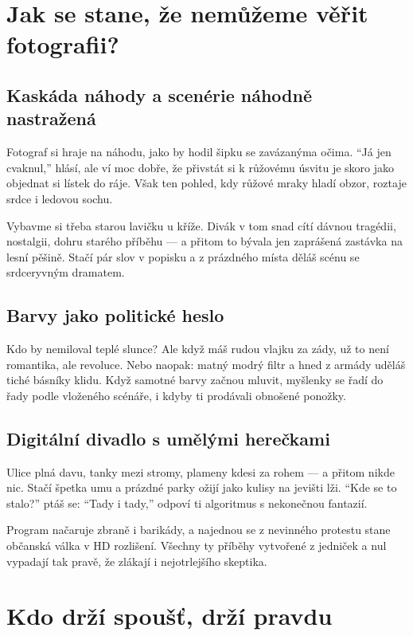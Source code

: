 \documentclass[12pt]{article}
\begin{document}
\section{Jak se stane, že nemůžeme věřit fotografii?} 
\subsection{Kaskáda náhody a scenérie {náhodně} nastražená}
Fotograf si hraje na náhodu, jako by hodil šipku se zavázanýma očima. \enquote{Já jen cvaknul,} hlásí, ale ví moc dobře, 
že přivstát si k růžovému úsvitu je skoro jako objednat si lístek do ráje. Však ten pohled, kdy růžové mraky hladí 
obzor, roztaje srdce i ledovou sochu.

Vybavme si třeba starou lavičku u kříže. Divák v tom snad cítí dávnou tragédii, nostalgii, dohru starého příběhu --- 
a přitom to bývala jen zaprášená zastávka na lesní pěšině. Stačí pár slov v popisku a z prázdného místa děláš scénu se 
srdceryvným dramatem.

\subsection{Barvy jako politické heslo}
Kdo by nemiloval teplé slunce? Ale když máš rudou vlajku za zády, už to není romantika, ale revoluce. Nebo naopak: 
matný modrý filtr a hned z armády uděláš tiché básníky klidu. Když samotné barvy začnou mluvit, myšlenky se řadí do řady 
podle vloženého scénáře, i kdyby ti prodávali obnošené ponožky.

\subsection{Digitální divadlo s umělými herečkami}
Ulice plná davu, tanky mezi stromy, plameny kdesi za rohem --- a přitom nikde nic. Stačí špetka umu a prázdné parky 
ožijí jako kulisy na jevišti lži. \enquote{Kde se to stalo?} ptáš se: \enquote{Tady i tady,} odpoví ti algoritmus s 
nekonečnou fantazií.

Program načaruje zbraně i barikády, a najednou se z nevinného protestu stane občanská válka v HD rozlišení. Všechny ty 
příběhy vytvořené z jedniček a nul vypadají tak pravě, že zlákají i nejotrlejšího skeptika.

\section{Kdo drží spoušť, drží pravdu}
\end{document}
